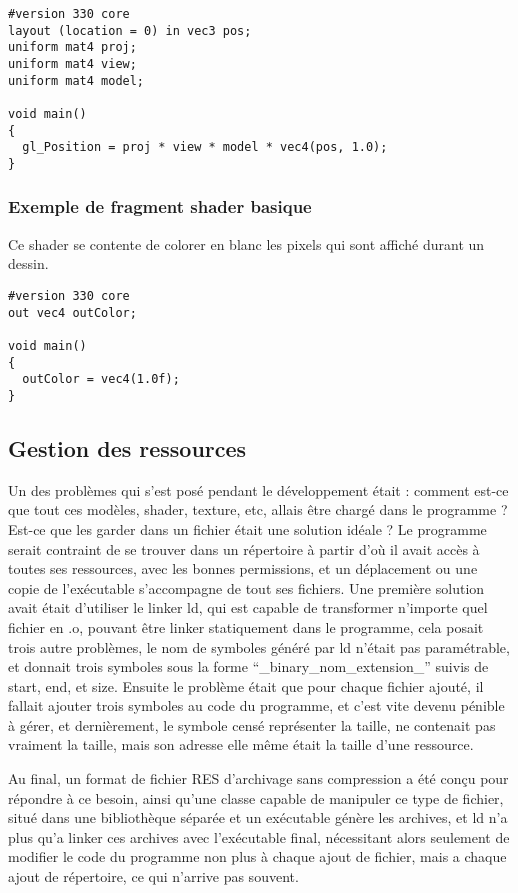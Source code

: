 \documentclass[pdftex, 11pt, a4paper, titlepage]{article}
\begin{document}
\begin{lstlisting}
#version 330 core
layout (location = 0) in vec3 pos;
uniform mat4 proj;
uniform mat4 view;
uniform mat4 model;

void main()
{
  gl_Position = proj * view * model * vec4(pos, 1.0);
}
\end{lstlisting}

\subsubsection{Exemple de fragment shader basique}
Ce shader se contente de colorer en blanc les pixels qui sont affiché
durant un dessin.

\begin{lstlisting}
#version 330 core
out vec4 outColor;

void main()
{
  outColor = vec4(1.0f);
}
\end{lstlisting}

\subsection{Gestion des ressources}

Un des problèmes qui s'est posé pendant le développement était :
comment est-ce que tout ces modèles, shader, texture, etc, allais être
chargé dans le programme ?  Est-ce que les garder dans un fichier
était une solution idéale ? Le programme serait contraint de se
trouver dans un répertoire à partir d'où il avait accès à toutes ses
ressources, avec les bonnes permissions, et un déplacement ou une
copie de l'exécutable s'accompagne de tout ses fichiers.  Une première
solution avait était d'utiliser le linker ld, qui est capable de
transformer n'importe quel fichier en .o, pouvant être linker
statiquement dans le programme, cela posait trois autre problèmes, le
nom de symboles généré par ld n'était pas paramétrable, et donnait
trois symboles sous la forme ``\_binary\_nom\_extension\_'' suivis de
start, end, et size. Ensuite le problème était que pour chaque fichier
ajouté, il fallait ajouter trois symboles au code du programme, et
c'est vite devenu pénible à gérer, et dernièrement, le symbole censé
représenter la taille, ne contenait pas vraiment la taille, mais son
adresse elle même était la taille d'une ressource.

Au final, un format de fichier RES d'archivage sans compression a été
conçu pour répondre à ce besoin, ainsi qu'une classe capable de
manipuler ce type de fichier, situé dans une bibliothèque séparée et
un exécutable génère les archives, et ld n'a plus qu'a linker ces
archives avec l'exécutable final, nécessitant alors seulement de
modifier le code du programme non plus à chaque ajout de fichier, mais
a chaque ajout de répertoire, ce qui n'arrive pas souvent.
\end{document}
